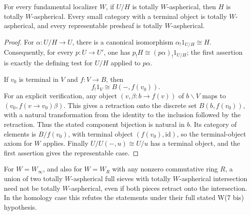 \begin{proposition}\label{A:audit-prop8and9a}
For every fundamental localizer $W$, if $U/H$ is totally $W$-aspherical, then $H$ is totally $W$-aspherical. Every small category with a terminal object is totally $W$-aspherical, and every representable presheaf is totally $W$-aspherical.
\end{proposition}

\begin{proof}
For $\alpha:U/H\to U$, there is a canonical isomorphism $\alpha_!1_{U/H}\cong H$. Consequently, for every $p:U\to U'$, one has $p_!H\cong(p\alpha)_!1_{U/H}$; the first assertion is exactly the defining test for $U/H$ applied to $p\alpha$.

If $v_0$ is terminal in $V$ and $f:V\to B$, then
\[
 f_!1_V\cong B(-,f(v_0)).
\]
For an explicit verification, any object $(v,\beta:b\to f(v))$ of $b\backslash V$ maps to $(v_0,f(v\to v_0)\beta)$. This gives a retraction onto the discrete set $B(b,f(v_0))$, with a natural transformation from the identity to the inclusion followed by the retraction. Thus the stated component bijection is natural in $b$. Its category of elements is $B/f(v_0)$, with terminal object $(f(v_0),\mathrm{id})$, so the terminal-object axiom for $W$ applies. Finally $U/U(-,u)\cong U/u$ has a terminal object, and the first assertion gives the representable case.
\end{proof}

\begin{theorem}\label{A:audit-prop9b}
For $W=W_\infty$, and also for $W=W_R$ with any nonzero commutative ring $R$, a union of two totally $W$-aspherical full sieves with totally $W$-aspherical intersection need not be totally $W$-aspherical, even if both pieces retract onto the intersection. In the homology case this refutes the statements under their full stated W(7 bis) hypothesis.
\end{theorem}

